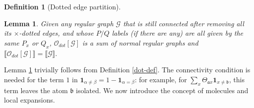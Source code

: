 \documentclass{article}
\newcommand{\1}{\mathds{1}}
\numberwithin{equation}{section}
\newcommand{\ord}{{\rm{ord}}}
\newcommand{\al}{\alpha}
\newcommand{\be}{\begin{equation}}
\newcommand{\ee}{\end{equation}}
\newcommand{\fa}{{\mathfrak a}}
\newcommand{\fb}{{\mathfrak b}}
\newcommand{\rDot}{\mathbf {rDot}}
\renewcommand{\cal}{\mathcal}
\theoremstyle{plain} %
\newtheorem{lemma}[theorem]{Lemma}
\newtheorem{definition}[theorem]{Definition}
\theoremstyle{remark}
\newcommand{\cor}{\color{red}}
\newcommand{\hty}[1]{{\cor (ht: #1) }}
\begin{document}
\begin{definition}[Dotted edge partition]

  \end{definition}
\begin{lemma}\label{lem Odot}
Given any regular graph $\cal G$ that is still connected after removing all its $\times$-dotted edges, and whose $P/Q$ labels (if there are any) are all given by the same $P_x$ or $Q_x$, $\cal O_{dot}[\cal G]$ is a sum of normal regular graphs and $\llbracket \cal O_{dot}[\cal G]\rrbracket  =\llbracket \cal G\rrbracket.$
\end{lemma}

Lemma \ref{lem Odot} trivially follows from Definition \ref{dot-def}. The connectivity condition is needed for the term $1$ in $\mathbf 1_{\al\ne \beta} =1 - \mathbf 1_{\al = \beta}$: for example, for $\sum_x \Theta_{\fa x}\mathbf 1_{x\ne \fb}$, this term leaves the atom $\fb$ isolated. %
We now  introduce the  concept of molecules and  local expansions. 
\end{document}
